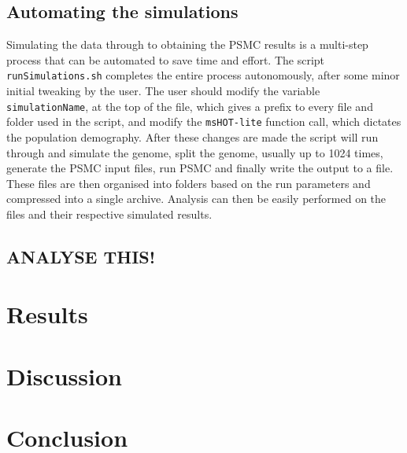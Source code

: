 \documentclass[]{article}
\begin{document}
\subsection{Automating the simulations}

Simulating the data through to obtaining the PSMC results is a multi-step process that can be automated to save time and effort. The script \verb|runSimulations.sh| completes the entire process autonomously, after some minor initial tweaking by the user. The user should modify the variable \verb|simulationName|, at the top of the file, which gives a prefix to every file and folder used in the script, and modify the \verb|msHOT-lite| function call, which dictates the population demography. After these changes are made the script will run through and simulate the genome, split the genome, usually up to 1024 times, generate the PSMC input files, run PSMC and finally write the output to a file. These files are then organised into folders based on the run parameters and compressed into a single archive. Analysis can then be easily performed on the files and their respective simulated results.

\subsection{ANALYSE THIS!}

\section{Results}
\section{Discussion}
\section{Conclusion}

{}
\end{document}
